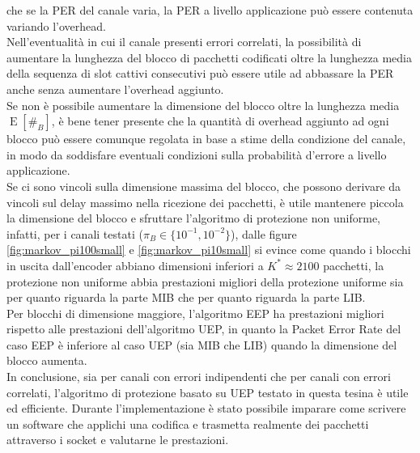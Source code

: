 \documentclass[italian, a4paper, 12pt]{article}
\newcommand{\E}[1]{\operatorname{E}\left[#1\right]}
\newcommand{\EnB}{\E{\#_B}}
\begin{document}
che se la PER del canale varia, la PER a livello applicazione può essere contenuta
variando l'overhead.\\
Nell'eventualità in cui il canale presenti errori correlati,
la possibilità di aumentare la lunghezza del blocco di pacchetti codificati oltre la lunghezza media della sequenza
di slot cattivi consecutivi può essere utile ad abbassare la PER anche senza aumentare l'overhead aggiunto.\\
Se non è possibile aumentare la dimensione del blocco oltre la lunghezza media $\EnB$, è bene 
tener presente che la quantità di overhead aggiunto ad ogni blocco può essere comunque
regolata in base a stime della condizione del canale, in modo da soddisfare eventuali condizioni
sulla probabilità d'errore a livello applicazione.\\
Se ci sono vincoli sulla dimensione massima del blocco, che possono derivare 
da vincoli sul delay massimo nella ricezione dei pacchetti, è utile mantenere 
piccola la dimensione del blocco e sfruttare l'algoritmo di protezione non uniforme, infatti,
per i canali testati ($\pi_B \in\{10^{-1},10^{-2}\}$), dalle figure \ref{fig:markov_pi100small} 
e \ref{fig:markov_pi10small} si evince come quando i blocchi 
in uscita dall'encoder abbiano dimensioni inferiori a $K^* \approx 2100$ pacchetti, 
la protezione non uniforme abbia prestazioni migliori della protezione uniforme sia per quanto riguarda la
parte MIB che per quanto riguarda la parte LIB.\\
Per blocchi di dimensione maggiore, l'algoritmo EEP ha prestazioni 
migliori rispetto alle prestazioni dell'algoritmo UEP, in quanto la Packet
Error Rate del caso EEP è inferiore al caso UEP (sia MIB che LIB) quando la dimensione del blocco aumenta.\\
In conclusione, sia per canali con errori indipendenti che per canali con errori correlati, l'algoritmo di protezione basato su UEP testato in questa tesina è utile ed efficiente. Durante l'implementazione è stato possibile imparare come scrivere un software che applichi una codifica e trasmetta realmente dei pacchetti attraverso i socket e valutarne le prestazioni.

\printbibliography[heading=bibnumbered, title=Bibliografia]
\end{document}
